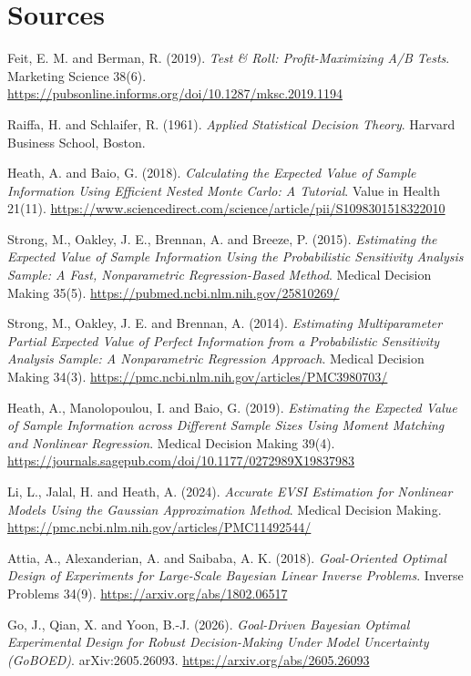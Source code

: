 \section*{Sources}
\begingroup\raggedright
\begin{enumerate}[label={[\arabic*]},leftmargin=2.5em]
\item Feit, E. M. and Berman, R. (2019). \emph{Test \& Roll: Profit-Maximizing A/B Tests}. Marketing Science 38(6). \url{https://pubsonline.informs.org/doi/10.1287/mksc.2019.1194}
\item Raiffa, H. and Schlaifer, R. (1961). \emph{Applied Statistical Decision Theory}. Harvard Business School, Boston.
\item Heath, A. and Baio, G. (2018). \emph{Calculating the Expected Value of Sample Information Using Efficient Nested Monte Carlo: A Tutorial}. Value in Health 21(11). \url{https://www.sciencedirect.com/science/article/pii/S1098301518322010}
\item Strong, M., Oakley, J. E., Brennan, A. and Breeze, P. (2015). \emph{Estimating the Expected Value of Sample Information Using the Probabilistic Sensitivity Analysis Sample: A Fast, Nonparametric Regression-Based Method}. Medical Decision Making 35(5). \url{https://pubmed.ncbi.nlm.nih.gov/25810269/}
\item Strong, M., Oakley, J. E. and Brennan, A. (2014). \emph{Estimating Multiparameter Partial Expected Value of Perfect Information from a Probabilistic Sensitivity Analysis Sample: A Nonparametric Regression Approach}. Medical Decision Making 34(3). \url{https://pmc.ncbi.nlm.nih.gov/articles/PMC3980703/}
\item Heath, A., Manolopoulou, I. and Baio, G. (2019). \emph{Estimating the Expected Value of Sample Information across Different Sample Sizes Using Moment Matching and Nonlinear Regression}. Medical Decision Making 39(4). \url{https://journals.sagepub.com/doi/10.1177/0272989X19837983}
\item Li, L., Jalal, H. and Heath, A. (2024). \emph{Accurate EVSI Estimation for Nonlinear Models Using the Gaussian Approximation Method}. Medical Decision Making. \url{https://pmc.ncbi.nlm.nih.gov/articles/PMC11492544/}
\item Attia, A., Alexanderian, A. and Saibaba, A. K. (2018). \emph{Goal-Oriented Optimal Design of Experiments for Large-Scale Bayesian Linear Inverse Problems}. Inverse Problems 34(9). \url{https://arxiv.org/abs/1802.06517}
\item Go, J., Qian, X. and Yoon, B.-J. (2026). \emph{Goal-Driven Bayesian Optimal Experimental Design for Robust Decision-Making Under Model Uncertainty (GoBOED)}. arXiv:2605.26093. \url{https://arxiv.org/abs/2605.26093}

\end{enumerate}

